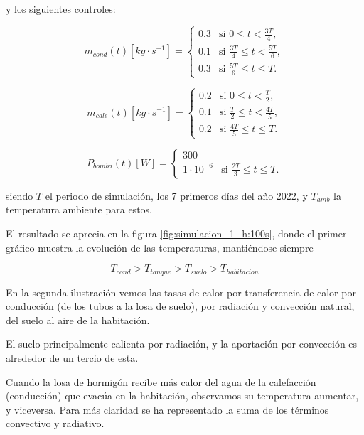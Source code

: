 y los siguientes controles:

\begin{equation}
	\dot{m}_{cond}(t)[kg \cdot s^{-1}] =
	\begin{cases}
		0.3 & \text{si } 0 \leq t < \frac{3T}{4},            \\
		0.1 & \text{si } \frac{3T}{4} \leq t < \frac{5T}{6}, \\
		0.3 & \text{si } \frac{5T}{6} \leq t \leq T.
	\end{cases}
\end{equation}

\begin{equation}
	\dot{m}_{cale}(t)[kg \cdot s^{-1}] =
	\begin{cases}
		0.2 & \text{si } 0 \leq t < \frac{T}{2},            \\
		0.1 & \text{si } \frac{T}{2} \leq t < \frac{4T}{5}, \\
		0.2 & \text{si } \frac{4T}{5} \leq t \leq T.
	\end{cases}
\end{equation}

\begin{equation}
	P_{bomba}(t)[W] =
	\begin{cases}
		300                                                      \\
		1 \cdot 10^{-6} & \text{si } \frac{2T}{3} \leq t \leq T.
	\end{cases}
\end{equation}

siendo $T$ el periodo de simulación, los 7 primeros días del año 2022, y
$T_{amb}$ la temperatura ambiente para estos.

El resultado se aprecia en la figura \ref{fig:simulacion_1_h:100s},
donde el primer gráfico muestra la evolución de las temperaturas,
mantiéndose siempre

\begin{equation*}
	T_{cond} > T_{tanque} > T_{suelo} > T_{habitacion}
\end{equation*}

En la segunda ilustración vemos las tasas de calor por transferencia de calor
por conducción (de los tubos a la losa de suelo), por radiación y convección
natural, del suelo al aire de la habitación.

El suelo principalmente calienta por radiación, y la aportación por
convección es alrededor de un tercio de esta.

Cuando la losa de hormigón recibe más calor del agua de la calefacción
(conducción) que evacúa en la habitación, observamos su temperatura aumentar, y
viceversa. Para más claridad se ha representado la suma de los términos
convectivo y radiativo.

